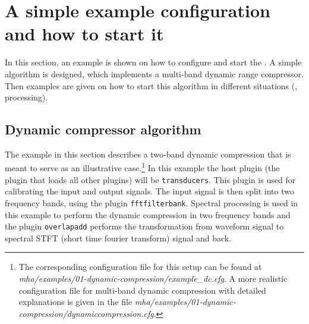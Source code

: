 
\section{A simple example configuration and how to start it}%
\label{sec:scenarios}%
%
%
%

In this section, an example is shown on how to configure and start the
\mha{}. A simple algorithm is designed, which implements a 
multi-band dynamic range compressor. Then examples are given on
how to start this algorithm in different situations (\mhad{}, \Matlab{} processing).

\subsection{Dynamic compressor algorithm}%
\label{sec:dyncmp}%

The example in this section describes a two-band dynamic compression
that is meant to serve as an illustrative case.\footnote{
  The corresponding configuration file for this setup can be found at
  \emph{mha/examples/01-dynamic-compression/example\_dc.cfg}.
  A more realistic configuration file for multi-band dynamic compression
  with detailed explanations is given in the file
  \emph{mha/examples/01-dynamic-compression/dynamiccompression.cfg}.
}
%
In this example the host plugin (the plugin that loads all other
plugins) will be \verb!transducers!.
%
This plugin is used for calibrating the input and output signals.
%
The input signal is then split into two frequency bands, using the
\mha{} plugin \verb!fftfilterbank!.
%
Spectral processing is used in this example to perform the dynamic
compression in two frequency bands and the \mha{} plugin
\verb!overlapadd! performs the transformation from waveform signal to
spectral STFT (short time fourier transform) signal and back.

